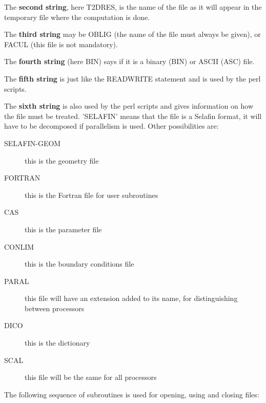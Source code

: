 The \textbf{second string}, here T2DRES, is the name of the file as it will
appear in the temporary file where the computation is done.

The \textbf{third string} may be OBLIG (the name of the file must always be
given), or FACUL (this file is not mandatory).

The \textbf{fourth string} (here BIN) says if it is a binary (BIN) or ASCII
(ASC) file.

The \textbf{fifth string} is just like the READWRITE statement and is used by
the perl scripts.

The \textbf{sixth string} is also used by the perl scripts and gives
information on how the file must be treated. 'SELAFIN' means that the file is a
Selafin format, it will have to be decomposed if parallelism is used. Other
possibilities are:
\begin{description}
  \item [SELAFIN-GEOM] this is the geometry file
  \item [FORTRAN] this is the Fortran file for user subroutines
  \item [CAS] this is the parameter file
  \item [CONLIM] this is the boundary conditions file
  \item [PARAL] this file will have an extension added to its name, for
    distinguishing between processors
  \item [DICO] this is the dictionary
  \item [SCAL] this file will be the same for all processors
\end{description}

The following sequence of subroutines is used for opening, using and closing
files:

